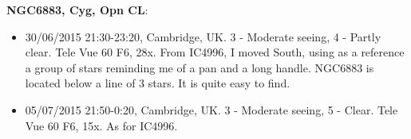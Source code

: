 {\bf NGC6883, Cyg, Opn CL}:
\begin{itemize}
\item 30/06/2015 21:30-23:20, Cambridge, UK. 3 - Moderate seeing, 4 - Partly clear. Tele Vue 60 F6, 28x. From IC4996, I moved South, using as a reference a group of stars reminding me of a pan and a long handle. NGC6883 is located below a line of 3 stars. It is quite easy to find.
\item 05/07/2015 21:50-0:20, Cambridge, UK. 3 - Moderate seeing, 5 - Clear. Tele Vue 60 F6, 15x. As for IC4996.
\end{itemize}

